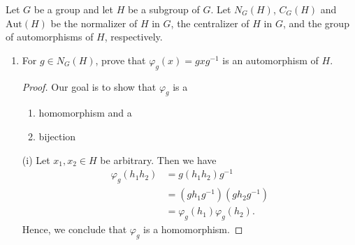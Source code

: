 \documentclass[a4paper]{article}
\begin{document}
\begin{problem}
    Let \( G  \) be a group and let \( H  \) be a subgroup of \( G  \). Let \( {N}_{G}(H) \), \( {C}_{G}(H) \) and \( \text{Aut}(H)  \) be the normalizer of \( H  \) in \( G  \), the centralizer of \( H  \) in \( G  \), and the group of automorphisms of \( H \), respectively.
\begin{enumerate}
    \item[(a)] For \( g \in {N}_{G}(H)  \), prove that \( {\varphi}_{g}(x) = g x g^{-1} \) is an automorphism of \( H  \).
        \begin{proof}
        Our goal is to show that \( {\varphi}_{g} \) is a 
        \begin{enumerate}
            \item[(i)] homomorphism and a
            \item[(ii)] bijection
        \end{enumerate}
        
        (i) Let \( {x}_{1}, {x}_{2} \in H \) be arbitrary. Then we have 
        \begin{align*}
            {\varphi}_{g}({h}_{1}{h}_{2}) &= g ({h}_{1} {h}_{2}) g^{-1} \\
                                          &= (g {h}_{1} g^{-1})(g {h}_{2} g^{-1}) \\
                                          &= {\varphi}_{g}({h}_{1}) {\varphi}_{g}({h}_{2}).
        \end{align*}
        Hence, we conclude that \( {\varphi}_{g} \) is a homomorphism.


\end{proof}
\end{enumerate}
\end{problem}
\end{document}
